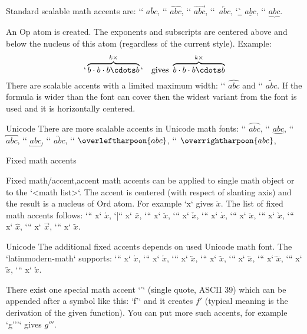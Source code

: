 Standard scalable math accents are:
\x`\overline` $\overline{abc}$,
\x`\overbrace` $\overbrace{abc}$,
\x`\overrightarrow` $\overrightarrow{abc}$,
\x`\overleftarrow`~$\overleftarrow{abc}$,
\x`\underline` $\underline{abc}$,
\x`\underbrace` $\underbrace{abc}$.

An Op atom is created. The exponents and subscripts are centered above
and below the nucleus of this atom (regardless of the current style). Example:
$$
  `\overbrace {b\cdot b\cdot b \cdots b}^{k\times}` \quad \hbox{gives }
  \overbrace {b\cdot b\cdot b \cdots b}^{k\times}
$$
There are scalable accents with a limited maximum width:
\x`\widehat` $\widehat{abc}$ and \x`\widetilde` $\widetilde{abc}$. If the
formula is wider than the font can cover then the widest variant from the
font is used and it is horizontally centered.

\new Unicode
There are more scalable accents in Unicode math fonts:
\x`\overparen` $\overparen{abc}$, \x`\underparen` $\underparen{abc}$,
\x`\overbracket` $\overbracket{abc}$, \x`\underbracket` $\underbracket{abc}$,
\x`\overleftrightarrow` $\overleftrightarrow{abc}$,
\x`\overleftharpoon` $\overleftharpoon{abc}$,
\x`\overrightharpoon` $\overrightharpoon{abc}$,


\secc Fixed math accents

Fixed \ii math/accent,accent math accents can be applied to single math object or to the `{<math list>}`.
The accent is centered (with respect of slanting axis) and the result is a
nucleus of Ord
atom. For example `\dot x` gives $\dot x$. The list of fixed math accents
follows: \x`\acute`` x` $\acute x$, \x`\bar`` x` $\bar x$,
\x`\breve`` x` $\breve x$, \x`\check`` x` $\check x$,
\x`\dot`` x` $\dot x$, \x`\ddot`` x` $\ddot x$,
\x`\grave`` x` $\grave x$, \x`\hat`` x` $\hat x$,
\x`\vec`` x` $\vec x$, \x`\tilde`` x` $\tilde x$.

\new Unicode
The additional fixed accents depends on used Unicode math font. The
`latinmodern-math` supports:
\x`\ovhook`` x` $\ovhook x$, \x`\ocirc`` x` $\ocirc x$,
\x`\leftharpoonaccent`` x` $\leftharpoonaccent x$, \x`\rightharpoonaccent`` x` $\rightharpoonaccent x$,
\x`\dddot`` x` $\dddot x$, \x`\ddddot`` x` $\ddddot x$,
\x`\widebridgeabove`` x` $\widebridgeabove x$, \x`\asteraccent`` x` $\asteraccent x$.

There exist one special math accent `'` (single quote, ASCII 39)
which can be appended after a symbol like this: `f'`
and it creates $f'$ (typical meaning is the
derivation of the given function). You can put more such accents, for
example `g'''` gives $g'''$.

